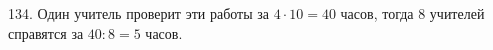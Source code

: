 134. Один учитель проверит эти работы за $4\cdot10=40$ часов, тогда 8 учителей справятся за $40:8=5$ часов.\\
